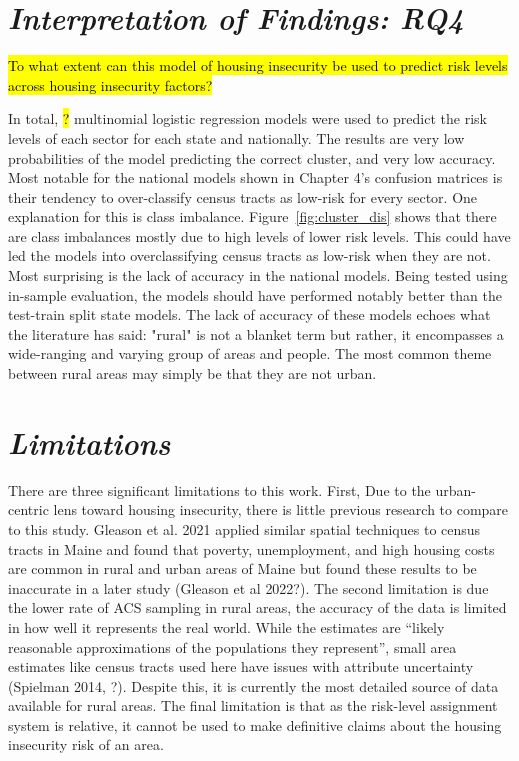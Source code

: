 \section{\textit{Interpretation of Findings: RQ4}}
\hl{To what extent can this model of housing insecurity be used to predict risk levels across housing insecurity factors?}

In total, \hl{?} multinomial logistic regression models were used to predict the risk levels of each sector for each state and nationally. The results are very low probabilities of the model predicting the correct cluster, and very low accuracy. Most notable for the national models shown in Chapter 4's confusion matrices is their tendency to over-classify census tracts as low-risk for every sector. One explanation for this is class imbalance. Figure~\ref{fig:cluster_dis} shows that there are class imbalances mostly due to high levels of lower risk levels. This could have led the models into overclassifying census tracts as low-risk when they are not. Most surprising is the lack of accuracy in the national models. Being tested using in-sample evaluation, the models should have performed notably better than the test-train split state models. The lack of accuracy of these models echoes what the literature has said: "rural" is not a blanket term but rather, it encompasses a wide-ranging and varying group of areas and people. The most common theme between rural areas may simply be that they are not urban. 


\section{\textit{Limitations}}

There are three significant limitations to this work. First, Due to the urban-centric lens toward housing insecurity, there is little previous research to compare to this study. Gleason et al. 2021 applied similar spatial techniques to census tracts in Maine and found that poverty, unemployment, and high housing costs are common in rural and urban areas of Maine but found these results to be inaccurate in a later study (Gleason et al 2022?). The second limitation is due the lower rate of ACS sampling in rural areas, the accuracy of the data is limited in how well it represents the real world. While the estimates are “likely reasonable approximations of the populations they represent”, small area estimates like census tracts used here have issues with attribute uncertainty (Spielman 2014, ?). Despite this, it is currently the most detailed source of data available for rural areas. The final limitation is that as the risk-level assignment system is relative, it cannot be used to make definitive claims about the housing insecurity risk of an area.  

